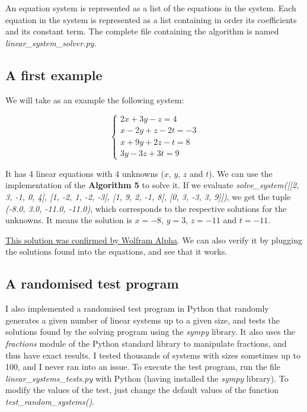 \documentclass[11pt]{article}
\begin{document}
An equation system is represented as a list of the equations in the system.
Each equation in the system is represented as a list containing in order its coefficients and its constant term.
The complete file containing the algorithm is named \textit{linear\_system\_solver.py}.

\subsection{A first example}

We will take as an example the following system:

\[
\begin{cases}
    2x + 3y - z = 4\\
    x - 2y + z - 2t = -3\\
    x + 9y + 2z - t = 8\\
    3y - 3z + 3t = 9
\end{cases}
\]

It has 4 linear equations with 4 unknowns ($x$, $y$, $z$ and $t$).
We can use the implementation of the \textbf{Algorithm 5} to solve it.
If we evaluate \textit{solve\_system([[2, 3, -1, 0, 4], [1, -2, 1, -2, -3], [1, 9, 2, -1, 8], [0, 3, -3, 3, 9]])}, we get the tuple \textit{(-8.0, 3.0, -11.0, -11.0)}, which corresponds to the respective solutions for the unknowns.
It means the solution is $x = -8$, $y = 3$, $z = -11$ and $t = -11$.

\href{https://www.wolframalpha.com/input?i=system+equation+calculator&assumption=%7B%22F%22%2C+%22SolveSystemOf4EquationsCalculator%22%2C+%22equation1%22%7D+-%3E%222x+%2B+3y+-+z+%3D+4%22&assumption=%22FSelect%22+-%3E+%7B%7B%22SolveSystemOf4EquationsCalculator%22%7D%2C+%22dflt%22%7D&assumption=%7B%22F%22%2C+%22SolveSystemOf4EquationsCalculator%22%2C+%22equation2%22%7D+-%3E%22x+-+2y+%2B+z+-+2t+%3D+-3%22&assumption=%7B%22F%22%2C+%22SolveSystemOf4EquationsCalculator%22%2C+%22equation3%22%7D+-%3E%22x+%2B+9y+%2B+2z+-+t+%3D+8%22&assumption=%7B%22F%22%2C+%22SolveSystemOf4EquationsCalculator%22%2C+%22equation4%22%7D+-%3E%223y+-+3z+%2B+3t+%3D+9%22}{This solution was confirmed by Wolfram Alpha}.
We can also verify it by plugging the solutions found into the equations, and see that it works.

\subsection{A randomised test program}

I also implemented a randomised test program in Python that randomly generates a given number of linear systems up to a given size, and tests the solutions found by the solving program using the \textit{sympy} library.
It also uses the \textit{fractions} module of the Python standard library to manipulate fractions, and thus have exact results.
I tested thousands of systems with sizes sometimes up to 100, and I never ran into an issue.
To execute the test program, run the file \textit{linear\_systems\_tests.py} with Python (having installed the \textit{sympy} library). To modify the values of the test, just change the default values of the function \textit{test\_random\_systems()}.
\end{document}
